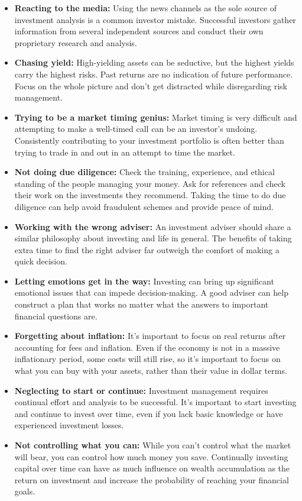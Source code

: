 \documentclass[
  12pt,
  oneside]{book}
\theoremstyle{definition}
\theoremstyle{definition}
\theoremstyle{definition}
\theoremstyle{definition}
\theoremstyle{remark}
\begin{document}
\begin{itemize}
\item
  \textbf{Reacting to the media:}
  Using the news channels as the sole source of investment analysis is a common investor mistake. Successful investors gather information from several independent sources and conduct their own proprietary research and analysis.
\item
  \textbf{Chasing yield:}
  High-yielding assets can be seductive, but the highest yields carry the highest risks. Past returns are no indication of future performance. Focus on the whole picture and don't get distracted while disregarding risk management.
\item
  \textbf{Trying to be a market timing genius:}
  Market timing is very difficult and attempting to make a well-timed call can be an investor's undoing. Consistently contributing to your investment portfolio is often better than trying to trade in and out in an attempt to time the market.
\item
  \textbf{Not doing due diligence:}
  Check the training, experience, and ethical standing of the people managing your money. Ask for references and check their work on the investments they recommend. Taking the time to do due diligence can help avoid fraudulent schemes and provide peace of mind.
\item
  \textbf{Working with the wrong adviser:}
  An investment adviser should share a similar philosophy about investing and life in general. The benefits of taking extra time to find the right adviser far outweigh the comfort of making a quick decision.
\item
  \textbf{Letting emotions get in the way:}
  Investing can bring up significant emotional issues that can impede decision-making. A good adviser can help construct a plan that works no matter what the answers to important financial questions are.
\item
  \textbf{Forgetting about inflation:}
  It's important to focus on real returns after accounting for fees and inflation. Even if the economy is not in a massive inflationary period, some costs will still rise, so it's important to focus on what you can buy with your assets, rather than their value in dollar terms.
\item
  \textbf{Neglecting to start or continue:}
  Investment management requires continual effort and analysis to be successful. It's important to start investing and continue to invest over time, even if you lack basic knowledge or have experienced investment losses.
\item
  \textbf{Not controlling what you can:}
  While you can't control what the market will bear, you can control how much money you save. Continually investing capital over time can have as much influence on wealth accumulation as the return on investment and increase the probability of reaching your financial goals.
\end{itemize}
\end{document}
